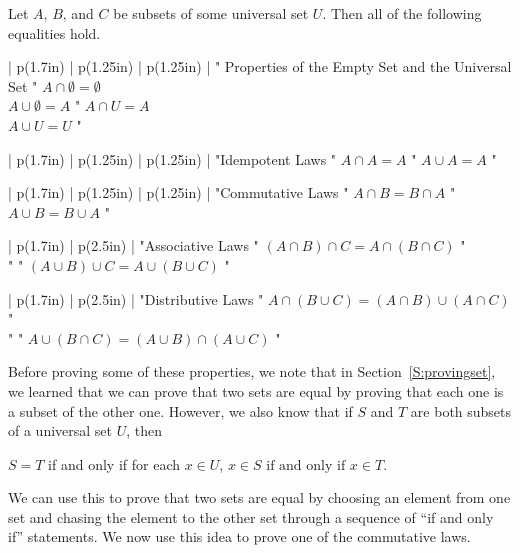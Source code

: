\begin{theorem} \label{T:algebraofsets}
Let  $A$, $B$, and  $C$  be subsets of some universal set  $U$.  Then all of the following equalities hold.

\vskip6pt
\noindent
\BeginTable
\def\L{\JustLeft}
\BeginFormat
| p(1.7in) | p(1.25in) | p(1.25in) |
\EndFormat
" Properties of the Empty Set
%
 and the Universal Set
 " %
$A \cap \emptyset  = \emptyset$ \\    
$A \cup \emptyset  = A$ 
" 
$A \cap U = A$ \\       
$A \cup U = U$ 
" \\
\EndTable

\vskip6pt
\BeginTable
\def\L{\JustLeft}
\BeginFormat
| p(1.7in) | p(1.25in) | p(1.25in) |
\EndFormat
"Idempotent Laws " $A \cap A = A$ " $A \cup A = A$ " \\
\EndTable
{}%

\vskip6pt
\BeginTable
\def\L{\JustLeft}
\BeginFormat
| p(1.7in) | p(1.25in) | p(1.25in) |
\EndFormat
"Commutative Laws " $A \cap B = B \cap A$ " $A \cup B = B \cup A$ " \\
\EndTable
{}%

\vskip6pt
\BeginTable
\def\L{\JustLeft}
\BeginFormat
| p(1.7in) | p(2.5in) |
\EndFormat"Associative Laws "  \L $\left( {A \cap B} \right) \cap C = A \cap \left( {B \cap C} \right)$ " \\
"                  "  \L $\left( {A \cup B} \right) \cup C = A \cup \left( {B \cup C} \right) $ " \\
\EndTable
{}%

\vskip6pt
\BeginTable
\def\L{\JustLeft}
\BeginFormat
| p(1.7in) | p(2.5in) |
\EndFormat"Distributive Laws "  \L $A \cap \left( {B \cup C} \right) = \left( {A \cap B} \right) \cup \left( {A \cap C} \right)$ " \\
"                  "  \L $A \cup \left( {B \cap C} \right) = \left( {A \cup B} \right) \cap \left( {A \cup C} \right)$ " \\
\EndTable
{}%
\end{theorem}

Before proving some of these properties, we note that in Section~\ref{S:provingset}, we learned that we can prove that two sets are equal by proving that each one is a subset of the other one.  However, we also know that if  $S$  and  $T$  are both subsets of a universal set $U$, then
\begin{list}{}
\item $S = T$  if and only if  for each $x \in U$, ${x \in S\text{  if and only if  }x \in T}$.
\end{list}
\vskip10pt
We can use this to prove that two sets are equal by choosing an element from one set and chasing  the element to the other set through a sequence of  ``if and only if'' statements.  We now use this idea to prove one of the commutative laws.

